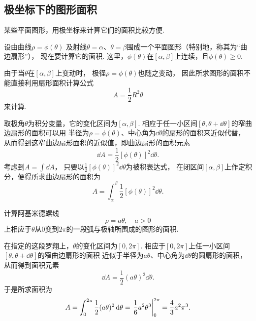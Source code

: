\subsection{极坐标下的图形面积}
某些平面图形，用极坐标来计算它们的面积比较方便.

设由曲线\(\rho = \phi(\theta)\)
及射线\(\theta=\alpha\)、\(\theta=\beta\)围成一个平面图形（特别地，称其为“曲边扇形”），
现在要计算它的面积.
这里，\(\phi(\theta)\)在\([\alpha,\beta]\)上连续，且\(\phi(\theta)\geq0\).

由于当\(\theta\)在\([\alpha,\beta]\)上变动时，
极径\(\rho=\phi(\theta)\)也随之变动，
因此所求图形的面积不能直接利用扇形面积计算公式\begin{equation*}
    A = \frac{1}{2} R^2 \theta
\end{equation*}来计算.

取极角\(\theta\)为积分变量，它的变化区间为\([\alpha,\beta]\).
相应于任一小区间\([\theta,\theta+\dd{\theta}]\)的窄曲边扇形的面积可以用
半径为\(\rho=\phi(\theta)\)、中心角为\(\dd{\theta}\)的扇形的面积来近似代替，
从而得到这窄曲边扇形面积的近似值，即曲边扇形的面积元素\begin{equation}
    \dd{A}
    = \frac{1}{2} [\phi(\theta)]^2 \dd{\theta}.
\end{equation}
考虑到\(A = \int \dd{A}\)，
只要以\(\frac{1}{2} [\phi(\theta)]^2 \dd{\theta}\)为被积表达式，
在闭区间\([\alpha,\beta]\)上作定积分，便得所求曲边扇形的面积为\begin{equation}
	A = \int_\alpha^\beta \frac{1}{2} [\phi(\theta)]^2 \dd{\theta}.
\end{equation}

\begin{example}
计算阿基米德螺线\begin{equation*}
	\rho = a \theta, \quad a>0
\end{equation*}上相应于\(\theta\)从\(0\)变到\(2\pi\)的一段弧与极轴所围成的图形的面积.
\begin{solution}
在指定的这段罗翔上，\(\theta\)的变化区间为\([0,2\pi]\).
相应于\([0,2\pi]\)上任一小区间\([\theta,\theta+\dd{\theta}]\)的窄曲边扇形的面积
近似于半径为\(a \theta\)、中心角为\(\dd{\theta}\)的圆扇形的面积，
从而得到面积元素\begin{equation*}
	\dd{A} = \frac12 (a \theta)^2 \dd{\theta}.
\end{equation*}
于是所求面积为\begin{equation*}
	A = \int_0^{2\pi} \frac12 (a \theta)^2 \dd{\theta}
	= \eval{\frac16 a^2 \theta^3}_0^{2\pi}
	= \frac43 a^2 \pi^3.
\end{equation*}
\end{solution}
\end{example}


